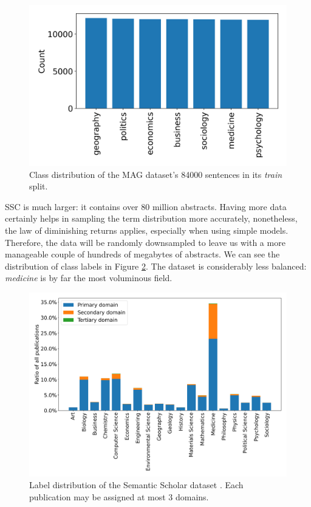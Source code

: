 \begin{figure}
    \centering
    \includegraphics[width=0.5\linewidth]{figures/mag-distribution.png}
    \captionsetup{width=.9\linewidth}
    \caption{Class distribution of the MAG  \cite{wang2019review} dataset's 84000 sentences in its \textit{train} split.}
    \label{fig:mag-distribtion}
\end{figure}

SSC is much larger: it contains over 80 million abstracts. Having more data certainly helps in sampling the term distribution more accurately, nonetheless, the law of diminishing returns applies, especially when using simple models. Therefore, the data will be randomly downsampled to leave us with a more manageable couple of hundreds of megabytes of abstracts. We can see the distribution of class labels in Figure \ref{fig:ss-distribution}. The dataset is considerably less balanced: \textit{medicine} is by far the most voluminous field.

\begin{figure}
    \centering
    \includegraphics[width=0.8\linewidth]{figures/ss-distribution.png}
    \captionsetup{width=.9\linewidth}
    \caption{Label distribution of the Semantic Scholar dataset \cite{Lo2020S2ORCTS}. Each publication may be assigned at most 3 domains.}
    \label{fig:ss-distribution}
\end{figure}

